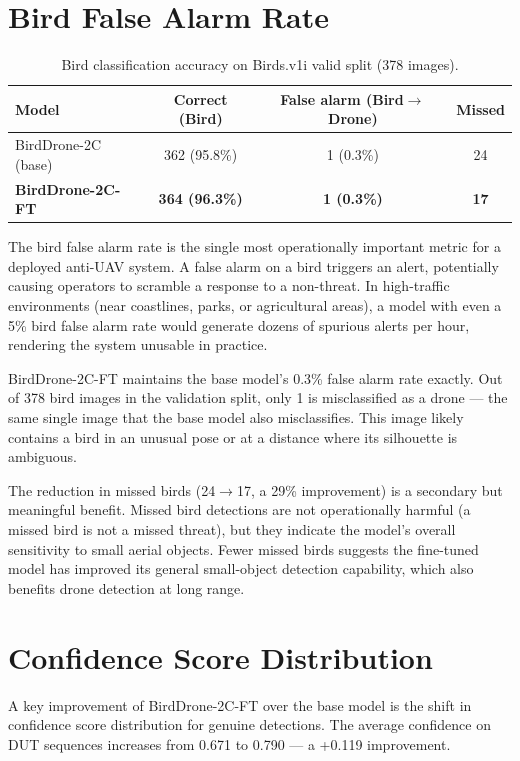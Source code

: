 \documentclass[12pt,a4paper]{report}
\begin{document}
\section{Bird False Alarm Rate}

\begin{table}[H]
\centering
\caption{Bird classification accuracy on Birds.v1i valid split (378 images).}
\label{tab:bird_fp}
\begin{tabular}{|l|c|c|c|}
\hline
\textbf{Model} & \textbf{Correct (Bird)} & \textbf{False alarm (Bird$\to$Drone)} & \textbf{Missed} \\
\hline
BirdDrone-2C (base) & 362 (95.8\%) & 1 (0.3\%) & 24 \\
\hline
\textbf{BirdDrone-2C-FT} & \textbf{364 (96.3\%)} & \textbf{1 (0.3\%)} & \textbf{17} \\
\hline
\end{tabular}
\end{table}

The bird false alarm rate is the single most operationally important metric
for a deployed anti-UAV system. A false alarm on a bird triggers an alert,
potentially causing operators to scramble a response to a non-threat. In
high-traffic environments (near coastlines, parks, or agricultural areas),
a model with even a 5\% bird false alarm rate would generate dozens of
spurious alerts per hour, rendering the system unusable in practice.

BirdDrone-2C-FT maintains the base model's 0.3\% false alarm rate exactly.
Out of 378 bird images in the validation split, only 1 is misclassified as
a drone --- the same single image that the base model also misclassifies.
This image likely contains a bird in an unusual pose or at a distance where
its silhouette is ambiguous.

The reduction in missed birds (24$\to$17, a 29\% improvement) is a secondary
but meaningful benefit. Missed bird detections are not operationally harmful
(a missed bird is not a missed threat), but they indicate the model's overall
sensitivity to small aerial objects. Fewer missed birds suggests the
fine-tuned model has improved its general small-object detection capability,
which also benefits drone detection at long range.

\section{Confidence Score Distribution}

A key improvement of BirdDrone-2C-FT over the base model is the shift in
confidence score distribution for genuine detections. The average confidence
on DUT sequences increases from 0.671 to 0.790 --- a +0.119 improvement.
\end{document}
